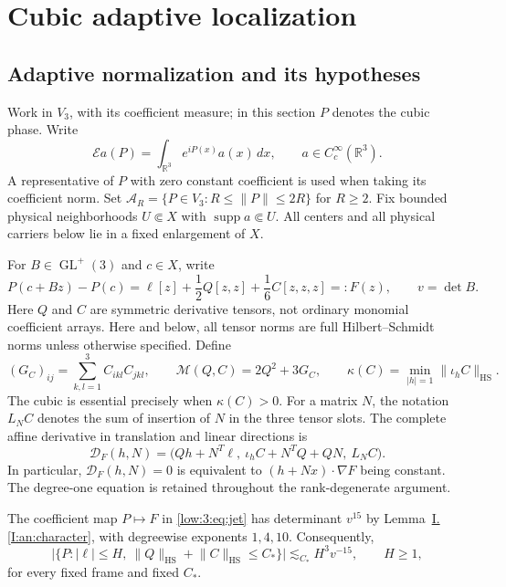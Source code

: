 \documentclass[11pt]{amsart}
\theoremstyle{definition}
\theoremstyle{remark}
\newcommand{\R}{\mathbb R}
\newcommand{\norm}[1]{\lVert #1\rVert}
\newcommand{\abs}[1]{\lvert #1\rvert}
\DeclareMathOperator{\supp}{supp}
\numberwithin{equation}{section}
\newcommand{\partIref}[1]{\hyperref[I:#1]{I.\ref*{I:#1}}}
\begin{document}
\section{Cubic adaptive localization}\label{low:degree3}

\subsection{Adaptive normalization and its hypotheses}\label{cubic:normalization}

Work in $V_3$, with its coefficient measure; in this section $P$ denotes the cubic phase. Write
\[
\mathcal E a(P)=\int_{\R^3}e^{iP(x)}a(x)\,dx,\qquad a\in C_c^\infty(\R^3).
\]
A representative of $P$ with zero constant coefficient is used when taking its coefficient norm. Set $\mathcal A_R=\{P\in V_3:R\le\|P\|\le2R\}$ for $R\ge2$. Fix bounded physical neighborhoods $U\Subset X$ with $\supp a\Subset U$. All centers and all physical carriers below lie in a fixed enlargement of $X$.

For $B\in\operatorname{GL}^+(3)$ and $c\in X$, write
\begin{equation}\label{low:3:eq:jet}
P(c+Bz)-P(c)=\ell[z]+\frac12Q[z,z]+\frac16C[z,z,z]=:F(z),\qquad v=\det B.
\end{equation}
Here $Q$ and $C$ are symmetric derivative tensors, not ordinary monomial coefficient arrays. Here and below, all tensor norms are full Hilbert--Schmidt norms unless otherwise specified. Define
\begin{equation}\label{low:3:eq:moment}
(G_C)_{ij}=\sum_{k,l=1}^3 C_{ikl}C_{jkl},\qquad \mathscr M(Q,C)=2Q^2+3G_C,\qquad \kappa(C)=\min_{\abs h=1}\norm{\iota_hC}_{\mathrm{HS}}.
\end{equation}
The cubic is essential precisely when $\kappa(C)>0$. For a matrix $N$, the notation $L_NC$ denotes the sum of insertion of $N$ in the three tensor slots. The complete affine derivative in translation and linear directions is
\begin{equation}\label{low:3:eq:affine-derivative}
\mathcal D_F(h,N)=\bigl(Qh+N^T\ell,\ \iota_hC+N^TQ+QN,\ L_NC\bigr).
\end{equation}
In particular, $\mathcal D_F(h,N)=0$ is equivalent to $(h+Nx)\cdot\nabla F$ being constant. The degree-one equation is retained throughout the rank-degenerate argument.

The coefficient map $P\mapsto F$ in \eqref{low:3:eq:jet} has determinant $v^{15}$ by Lemma~\partIref{an:character}, with degreewise exponents $1,4,10$. Consequently,
\begin{equation}\label{low:3:eq:one-window}
\bigl|\{P:\abs\ell\leq H,\ \norm Q_{\mathrm{HS}}+\norm C_{\mathrm{HS}}\leq C_*\}\bigr|\lesssim_{C_*}H^3v^{-15},\qquad H\geq1,
\end{equation}
for every fixed frame and fixed $C_*$.
\end{document}
